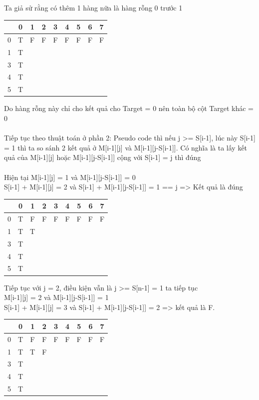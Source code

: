 \documentclass{article}
\begin{document}
    Ta giả sử rằng có thêm 1 hàng nữa là hàng rỗng 0 trước 1
    \begin{center}
        \begin{tabular}{|c|c|c|c|c|c|c|c|c|}
        \hline
        {}&{0}&{1}&{2}&{3}&{4}&{5}&{6}&{7}\\
        \hline
        0&T&F&F&F&F&F&F&F\\
        \hline
        1&T&&&&&&&\\
        \hline
        3&T&&&&&&&\\
        \hline
        4&T&&&&&&&\\
        \hline
        5&T&&&&&&&\\
        \hline
    \end{tabular}
    \end{center}
    Do hàng rỗng này chỉ cho kết quả cho Target = 0 nên toàn bộ cột Target khác = 0\\\\
    Tiếp tục theo thuật toán ở phần 2: Pseudo code thì nếu 
    j >= S[i-1], lúc này S[i-1] = 1 thì ta so sánh 2 kết quả ở M[i-1][j] và M[i-1][j-S[i-1]]. Có nghĩa là ta lấy kết quả của M[i-1][j] hoặc M[i-1][j-S[i-1]] cộng với S[i-1] = j thì đúng\\\\
    Hiện tại M[i-1][j] = 1 và M[i-1][j-S[i-1]] = 0\\
    S[i-1] + M[i-1][j] = 2 và S[i-1] + M[i-1][j-S[i-1]] = 1 == j => Kết quả là đúng
    \begin{center}
        \begin{tabular}{|c|c|c|c|c|c|c|c|c|}
        \hline
        {}&{0}&{1}&{2}&{3}&{4}&{5}&{6}&{7}\\
        \hline
        0&T&F&F&F&F&F&F&F\\
        \hline
        1&T&T&&&&&&\\
        \hline
        3&T&&&&&&&\\
        \hline
        4&T&&&&&&&\\
        \hline
        5&T&&&&&&&\\
        \hline
    \end{tabular}
    \end{center}
    Tiếp tục với j = 2, điều kiện vẫn là j >= S[n-1] = 1 ta tiếp tục\\
    M[i-1][j] = 2 và  M[i-1][j-S[i-1]] = 1\\
     S[i-1] + M[i-1][j] = 3 và S[i-1] + M[i-1][j-S[i-1]] = 2 => kết quả là F.
     \begin{center}
        \begin{tabular}{|c|c|c|c|c|c|c|c|c|}
        \hline
        {}&{0}&{1}&{2}&{3}&{4}&{5}&{6}&{7}\\
        \hline
        0&T&F&F&F&F&F&F&F\\
        \hline
        1&T&T&F&&&&&\\
        \hline
        3&T&&&&&&&\\
        \hline
        4&T&&&&&&&\\
        \hline
        5&T&&&&&&&\\
        \hline
    \end{tabular}
    \end{center}
\end{document}
